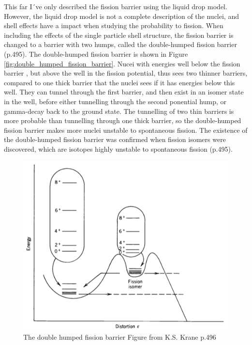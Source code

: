 \documentclass[]{article}
\begin{document}
\noindent This far I´ve only described the fission barrier using the liquid drop model. However, the liquid drop model is not a complete description of the nuclei, and shell effects have a impact when studying the probability to fission. When including the effects of the single particle shell structure, the fission barrier is changed to a barrier with two humps, called the double-humped fission barrier \cite{Krane1988} (p.495). The double-humped fission barrier is shown in Figure \ref{fig:double_humped_fission_barrier}. Nucei with energies well below the fission barrier , but above the well in the fission potential, thus sees two thinner barriers, compared to one thick barrier that the nuclei sees if it has energies below this well. They can tunnel through the first barrier, and then exist in an isomer state in the well, before either tunnelling through the second ponential hump, or gamma-decay back to the ground state.  The tunnelling of two thin barriers is more probable than tunnelling through one thick barrier, so the double-humped fission barrier makes more nuclei unstable to spontaneous fission. The existence of the double-humped fission barrier was confirmed when fission isomers were discovered, which are isotopes highly unstable to spontaneous fission \cite{Krane1988} (p.495). 

  \begin{figure}
 	\centering
 	\includegraphics[scale=0.7]{double_humped_fission_barrier.png}
 	\caption{The double humped fission barrier Figure from K.S. Krane p.496 \cite{Krane1988}}
 	\label{fig:smooth_fission_barrier}
 \end{figure}
\end{document}
